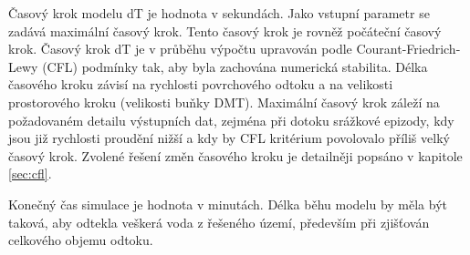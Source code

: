 Časový krok modelu \acs{dT} je hodnota v sekundách. Jako vstupní parametr se zadává maximální časový krok. Tento časový krok je rovněž počáteční časový krok. Časový krok \acs{dT} je v průběhu výpočtu upravován podle Courant-Friedrich-Lewy (\acs{CFL}) podmínky tak, aby byla zachována numerická stabilita. Délka časového kroku závisí na rychlosti povrchového odtoku a na velikosti prostorového kroku (velikosti buňky DMT). Maximální časový krok záleží na požadovaném detailu výstupních dat, zejména při dotoku srážkové epizody, kdy jsou již rychlosti proudění nižší a kdy by \acs{CFL} kritérium povolovalo příliš velký časový krok. Zvolené řešení změn časového kroku je detailněji popsáno v kapitole \ref{sec:cfl}. 



Konečný čas simulace je hodnota v minutách. Délka běhu modelu by měla být taková, aby odtekla veškerá voda z řešeného území, především při zjišťován celkového objemu odtoku.
 




